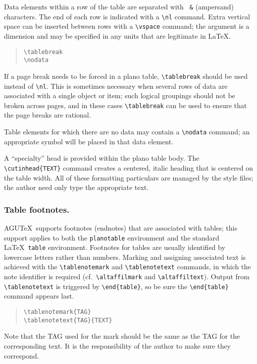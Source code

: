 Data elements within a row of the table are separated with {\tt 
\&} (ampersand) characters.  The end of each row is indicated with 
a \verb"\nl" command.  Extra vertical space can be inserted between 
rows with a \verb"\vspace" command; the argument is a dimension 
and may be specified in any units that are legitimate in \LaTeX.  

\begin{quote}
\verb"\tablebreak"\\
\verb"\nodata"
\end{quote}

If a page break needs to be forced in a plano table, \verb"\tablebreak" 
should be used instead of \verb"\nl".  This is sometimes necessary when 
several rows of data are associated with a single object or item; such 
logical groupings should not be broken across pages, and in these cases 
\verb"\tablebreak" can be used to ensure that the page breaks are rational. 

Table elements for which there are no data may contain a \verb"\nodata" 
command; an appropriate symbol will be placed in that data element.

A ``specialty'' head is provided within the plano table body.  The 
\verb"\cutinhead{TEXT}" command creates a centered, italic heading 
that is centered on the table width.  All of these formatting 
particulars are managed by the style files; the author need 
only type the appropriate text.

\subsubsection{Table footnotes.}
AGU\TeX\ supports footnotes (endnotes) that are associated with tables; this 
support applies to both the {\tt planotable} environment and the standard 
\LaTeX\ {\tt table} environment.  Footnotes for tables are usually identified 
by lowercase letters rather than numbers.  Marking and assigning associated 
text is achieved with the \verb"\tablenotemark" and \verb"\tablenotetext" 
commands, in which the note identifier is required (cf.\ \verb"\altaffilmark" 
and \verb"\altaffiltext").  Output from \verb"\tablenotetext" is triggered by 
\verb"\end{table}", so be sure the \verb"\end{table}" command appears last.

\begin{quote}
\verb"\tablenotemark{TAG}"\\
\verb"\tablenotetext{TAG}{TEXT}"
\end{quote}
Note that the {\small TAG} used for the mark should be the 
same as the {\small TAG} for the corresponding text.  It is 
the responsibility of the author to make sure they correspond.

